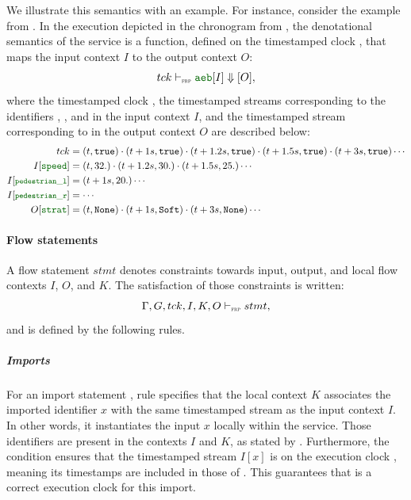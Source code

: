 We illustrate this semantics with an example.
For instance, consider the \aeb example from . In the execution
depicted in the chronogram from , the denotational
semantics of the  service is a function, defined on the timestamped clock \tck, that maps
the input context $I$ to the output context $O$:
\begin{equation*}
    \tck \vdashFrp \idf{aeb} [I] \Downarrow [O],
\end{equation*}
where the timestamped clock \tck, the timestamped streams corresponding to the identifiers
, , and  in the input context $I$, and the
timestamped stream corresponding to  in the output context $O$ are described below:
\begin{align*}
    \tck                              & = (t, \true) \next (t+1s, \true) \next (t+1.2s, \true) \next (t+1.5s, \true) \next (t+3s, \true) \cdots \\
    I[\idf{speed}]                    & = (t, 32.) \next (t+1.2s, 30.) \next (t+1.5s, 25.) \cdots                                               \\
    I[\mathfoot{\idf{pedestrian\_l}}] & = (t+1s, 20.) \cdots                                                                                    \\
    I[\mathfoot{\idf{pedestrian\_r}}] & = \cdots                                                                                                \\
    O[\idf{strat}]                    & = (t, \No) \next (t+1s, \Soft) \next (t+3s, \No) \cdots                                                 \\
\end{align*}

\paragraph{Flow statements}

A flow statement $stmt$ denotes constraints towards input, output, and local flow contexts $I$, $O$,
and $K$. The satisfaction of those constraints is written:
\begin{equation*}
    \stmtDenot{\tck}{I}{K}{stmt}{O},
\end{equation*}
and is defined by the following rules.

\subparagraph{Imports}

For an import statement , rule  specifies
that the local context $K$ associates the imported identifier $x$ with the same timestamped stream
as the input context $I$. In other words, it instantiates the input $x$ locally within the service.
Those identifiers are present in the contexts $I$ and $K$, as stated by
.
Furthermore, the condition  ensures that the timestamped stream $I[x]$ is on the
execution clock \tck, meaning its timestamps are included in those of \tck. This guarantees that
\tck is a correct execution clock for this import.


